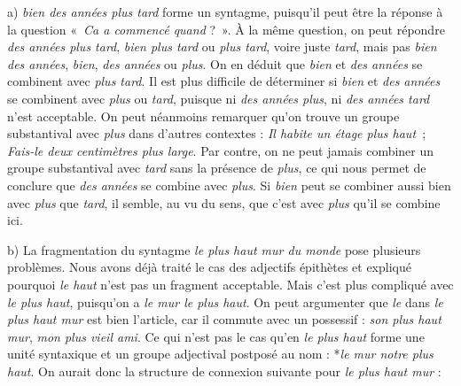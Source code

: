 { a) \textit{bien des années plus tard} forme un syntagme, puisqu’il peut être la réponse à la question «~\textit{Ca a commencé quand} ?~». À la même question, on peut répondre \textit{des années plus tard}, \textit{bien plus tard} ou \textit{plus tard}, voire juste \textit{tard}, mais pas \textit{bien des années}, \textit{bien}, \textit{des années} ou \textit{plus}. On en déduit que \textit{bien} et \textit{des années} se combinent avec \textit{plus tard}. Il est plus difficile de déterminer si \textit{bien} et \textit{des années} se combinent avec \textit{plus} ou \textit{tard}, puisque ni \textit{des années plus}, ni \textit{des années tard} n’est acceptable. On peut néanmoins remarquer qu’on trouve un groupe substantival avec \textit{plus} dans d’autres contextes : \textit{Il habite un étage plus haut~}; \textit{Fais-le deux centimètres plus large}. Par contre, on ne peut jamais combiner un groupe substantival avec \textit{tard} sans la présence de \textit{plus}, ce qui nous permet de conclure que \textit{des années} se combine avec \textit{plus}. Si \textit{bien} peut se combiner aussi bien avec \textit{plus} que \textit{tard}, il semble, au vu du sens, que c’est avec \textit{plus} qu’il se combine ici.

\begin{center}
\end{center}


b) La fragmentation du syntagme \textit{le plus haut mur du monde} pose plusieurs problèmes. Nous avons déjà traité le cas des adjectifs épithètes et expliqué pourquoi \textit{le haut} n’est pas un fragment acceptable. Mais c’est plus compliqué avec \textit{le plus haut}, puisqu’on a \textit{le mur le plus haut}. On peut argumenter que \textit{le} dans \textit{le plus haut mur} est bien l’article, car il commute avec un possessif : \textit{son plus haut mur}, \textit{mon plus vieil ami}. Ce qui n’est pas le cas qu’en \textit{le plus haut} forme une unité syntaxique et un groupe adjectival postposé au nom : *\textit{le mur notre plus haut}. On aurait donc la structure de connexion suivante pour \textit{le plus haut mur} :

}
